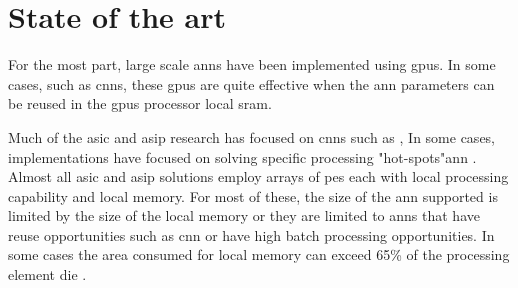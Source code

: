 
\chapter{State of the art}
\label{sec:State of the art}

For the most part, large scale \acp{ann} have been implemented using \acp{gpu}.
In some cases, such as \acp{cnn}, these \acp{gpu} are quite effective when the \ac{ann} parameters can be reused in the \acp{gpu} processor local \ac{sram}.

Much of the \ac{asic} and \ac{asip} research has focused on \acp{cnn} such as \cite{chen201614}\cite{farabet2011neuflow}\cite{azarkhish2017neurostream}, 
In some cases, implementations have focused on solving specific processing "hot-spots"\ac{ann} \cite{chen201614}.
Almost all \ac{asic} and \ac{asip} solutions employ arrays of \acp{pe} each with local processing capability and local memory.
For most of these, the size of the \ac{ann} supported is limited by the size of the local memory or they are limited to \acp{ann} that have reuse opportunities such as \ac{cnn} or have high batch processing opportunities.
In some cases \iffalse, as seen in \fref{fig:Example state-of-the-art die}\fi the area consumed for local memory can exceed 65\% of the 
processing element die \cite{kim2016neurocube}\cite{chen2014diannao}.

